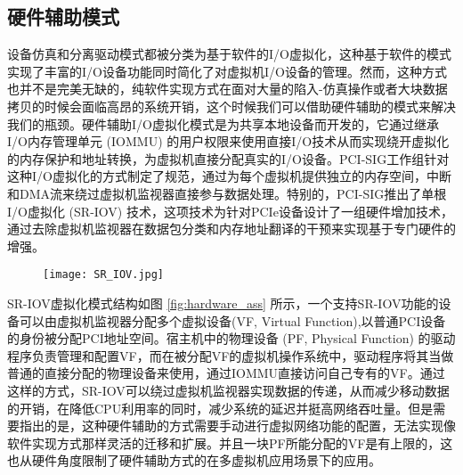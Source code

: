 \subsection{硬件辅助模式}
设备仿真和分离驱动模式都被分类为基于软件的I/O虚拟化，这种基于软件的模式实现了丰富的I/O设备功能同时简化了对虚拟机I/O设备的管理。然而，这种方式也并不是完美无缺的，纯软件实现方式在面对大量的陷入-仿真操作或者大块数据拷贝的时候会面临高昂的系统开销，这个时候我们可以借助硬件辅助的模式来解决我们的瓶颈。硬件辅助I/O虚拟化模式是为共享本地设备而开发的，它通过继承I/O内存管理单元 (IOMMU) 的用户权限来使用直接I/O技术从而实现绕开虚拟化的内存保护和地址转换，为虚拟机直接分配真实的I/O设备。PCI-SIG工作组针对这种I/O虚拟化的方式制定了规范，通过为每个虚拟机提供独立的内存空间，中断和DMA流来绕过虚拟机监视器直接参与数据处理。特别的，PCI-SIG推出了单根I/O虚拟化 (SR-IOV) 技术，这项技术为针对PCIe设备设计了一组硬件增加技术，通过去除虚拟机监视器在数据包分类和内存地址翻译的干预来实现基于专门硬件的增强。
\begin{figure}[!htp]
	\centering
	\texttt{[image: SR\_IOV.jpg]}
\end{figure}
SR-IOV虚拟化模式结构如图 \ref{fig:hardware_ass} 所示，一个支持SR-IOV功能的设备可以由虚拟机监视器分配多个虚拟设备(VF, Virtual Function),以普通PCI设备的身份被分配PCI地址空间。宿主机中的物理设备 (PF, Physical Function) 的驱动程序负责管理和配置VF，而在被分配VF的虚拟机操作系统中，驱动程序将其当做普通的直接分配的物理设备来使用，通过IOMMU直接访问自己专有的VF。通过这样的方式，SR-IOV可以绕过虚拟机监视器实现数据的传递，从而减少移动数据的开销，在降低CPU利用率的同时，减少系统的延迟并挺高网络吞吐量。但是需要指出的是，这种硬件辅助的方式需要手动进行虚拟网络功能的配置，无法实现像软件实现方式那样灵活的迁移和扩展。并且一块PF所能分配的VF是有上限的，这也从硬件角度限制了硬件辅助方式的在多虚拟机应用场景下的应用。


